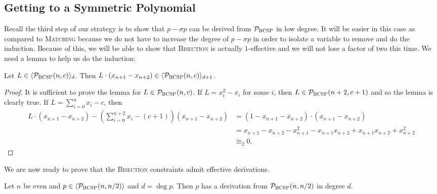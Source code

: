 \subsection{Getting to a Symmetric Polynomial}
Recall the third step of our strategy is to show that $p - \sigma p$ can be derived from $\mathcal P_{\textsc{BCSP}}$ in low degree. It will be easier in this case as compared to \textsc{Matching} because we do not have to increase the degree of $p - \sigma p$ in order to isolate a variable to remove and do the induction. Because of this, we will be able to show that \textsc{Bisection} is actually $1$-effective and we will not lose a factor of two this time.
We need a lemma to help us do the induction:
\begin{lemma}\label{lem:bcsp-induct}
Let $L \in \langle \mathcal P_{\textsc{BCSP}}(n,c) \rangle_d$. Then $L\cdot (x_{n+1} - x_{n+2}) \in \langle \mathcal P_{\textsc{BCSP}}(n,c) \rangle_{d+1}$.
\end{lemma}
\begin{proof}
It is sufficient to prove the lemma for $L \in \mathcal P_{\textsc{BCSP}}(n,c)$. If $L = x_i^2 - x_i$ for some $i$, then $L \in \mathcal P_{\textsc{BCSP}}(n+2,c+1)$ and so the lemma is clearly true. If $L = \sum_{i=0}^n x_i - c$, then 
\begin{align*}
L\cdot (x_{n+1} - x_{n+2}) - \left(\sum_{i=0}^{n+2} x_i - (c+1)\right)(x_{n+1} - x_{n+2}) &= (1-x_{n+1} - x_{n+2}) \cdot (x_{n+1} - x_{n+2}) \\
&= x_{n+1} - x_{n+2} - x_{n+1}^2 - x_{n+1}x_{n+2} + x_{n+1}x_{n+2} + x_{n+2}^2 \\
&\cong_2 0.
\end{align*} 
\end{proof}
We are now ready to prove that the \textsc{Bisection} constraints admit effective derivations.
\begin{theorem}\label{thm:bisec-effective}
Let $n$ be even and $p \in \langle \mathcal P_{\textsc{BCSP}}(n,n/2) \rangle$ and $d = \deg p$. Then $p$ has a derivation from $\mathcal P_{\textsc{BCSP}}(n,n/2)$ in degree $d$. 
\end{theorem}
